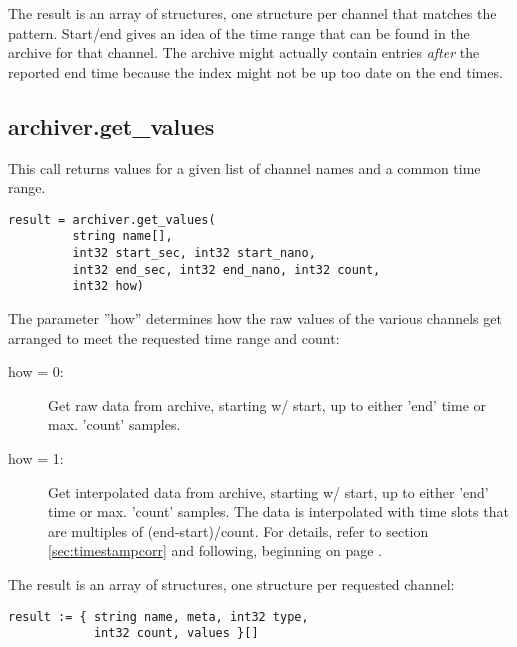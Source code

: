 The result is an array of structures, one structure
per channel that matches the pattern.
Start/end gives an idea of the time range that can
be found in the archive for that channel.
The archive might actually contain entries \emph{after}
the reported end time because the index might not
be up too date on the end times.

\subsection{archiver.get\_values}
This call returns values for a given list of channel names
and a common time range.

\begin{lstlisting}[keywordstyle=\sffamily]
result = archiver.get_values(
         string name[],
         int32 start_sec, int32 start_nano,
         int32 end_sec, int32 end_nano, int32 count,
         int32 how)
\end{lstlisting}

The parameter ''how'' determines how the raw values of the various
channels get arranged to meet the requested time range and count:
\begin{description}
\item[\sffamily how = 0:]
  Get raw data from archive, starting w/ start,
  up to either 'end' time or max. 'count' samples.
\item[\sffamily how = 1:]
  Get interpolated data from archive, starting w/ start,
  up to either 'end' time or max. 'count' samples.
  The data is interpolated with time slots that are multiples
  of (end-start)/count.
  For details, refer to section \ref{sec:timestampcorr} and following,
  beginning on page \pageref{sec:timestampcorr}.
\end{description}

\noindent The result is an array of structures, one structure per
requested channel:

\begin{lstlisting}[keywordstyle=\sffamily]
result := { string name, meta, int32 type,
            int32 count, values }[]
\end{lstlisting}


